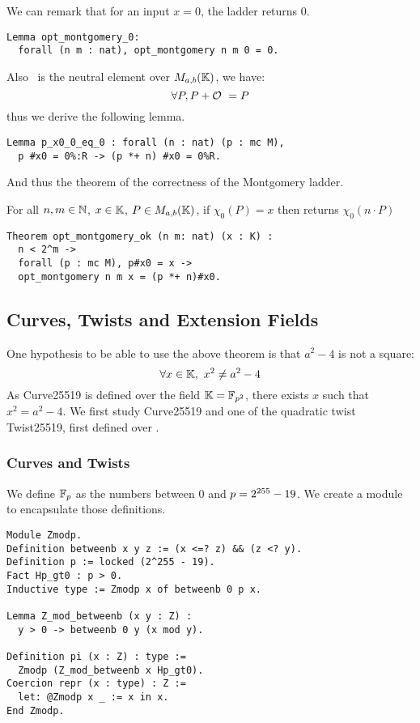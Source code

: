 We can remark that for an input $x = 0$, the ladder returns $0$.
\begin{lstlisting}[language=Coq]
Lemma opt_montgomery_0:
  forall (n m : nat), opt_montgomery n m 0 = 0.
\end{lstlisting}
Also \Oinf\ is the neutral element over $M_{a,b}(\mathbb{K})$, we have:
$$\forall P, P + \mathcal{O}\ = P$$
thus we derive the following lemma.
\begin{lstlisting}[language=Coq]
Lemma p_x0_0_eq_0 : forall (n : nat) (p : mc M),
  p #x0 = 0%:R -> (p *+ n) #x0 = 0%R.
\end{lstlisting}
And thus the theorem of the correctness of the Montgomery ladder.
\begin{theorem}
\label{montgomery-ladder-correct}
For all $n, m \in \mathbb{N}$, $x \in \mathbb{K}$, $P \in M_{a,b}(\mathbb{K})$,
if $\chi_0(P) = x$ then  returns $\chi_0(n \cdot P)$
\end{theorem}
\begin{lstlisting}[language=Coq]
Theorem opt_montgomery_ok (n m: nat) (x : K) :
  n < 2^m ->
  forall (p : mc M), p#x0 = x ->
  opt_montgomery n m x = (p *+ n)#x0.
\end{lstlisting}

\subsection{Curves, Twists and Extension Fields}

One hypothesis to be able to use the above theorem is that $a^2-4$ is not a square:
$$\forall x \in \mathbb{K},\ x^2 \neq a^2-4$$
As Curve25519 is defined over the field $\mathbb{K} = \mathbb{F}_{p^2}$, there exists $x$ such that $x^2 = a^2-4$.
We first study Curve25519 and one of the quadratic twist Twist25519, first defined over .

\subsubsection{Curves and Twists}

We define $\mathbb{F}_{p}$ as the numbers between $0$ and $p = 2^{255}-19$.
We create a  module to encapsulate those definitions.
\begin{lstlisting}[language=Coq]
Module Zmodp.
Definition betweenb x y z := (x <=? z) && (z <? y).
Definition p := locked (2^255 - 19).
Fact Hp_gt0 : p > 0.
Inductive type := Zmodp x of betweenb 0 p x.

Lemma Z_mod_betweenb (x y : Z) :
  y > 0 -> betweenb 0 y (x mod y).

Definition pi (x : Z) : type :=
  Zmodp (Z_mod_betweenb x Hp_gt0).
Coercion repr (x : type) : Z :=
  let: @Zmodp x _ := x in x.
End Zmodp.
\end{lstlisting}

